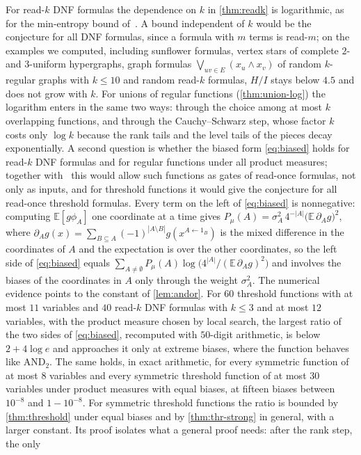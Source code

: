 \documentclass[11pt]{amsart}
\theoremstyle{definition}
\theoremstyle{remark}
\newcommand{\E}{\mathbb{E}}
\begin{document}
For read-$k$ DNF formulas the dependence on $k$ in \cref{thm:readk} is logarithmic, as for the min-entropy
bound of~\cite{ACKSW21}. A bound independent of $k$ would be the conjecture for all DNF formulas, since a formula
with $m$ terms is read-$m$; on the examples we computed, including sunflower formulas, vertex stars of complete $2$-
and $3$-uniform hypergraphs, graph formulas $\bigvee_{uv\in E}(x_u\wedge x_v)$ of random $k$-regular graphs with
$k\le10$ and random read-$k$ formulas, $H/I$ stays below $4.5$ and does not grow with $k$. For unions of regular
functions (\cref{thm:union-log}) the logarithm enters in the same two ways: through the choice among at most $k$
overlapping functions, and through the Cauchy--Schwarz step, whose factor $k$ costs only $\log k$ because the rank
tails and the level tails of the pieces decay exponentially. A second
question is whether the biased form \eqref{eq:biased} holds for read-$k$ DNF formulas and for regular functions
under all product measures; together with~\cite{OT13} this would allow such functions as gates of read-once
formulas, not only as inputs, and for threshold functions it would give the conjecture for all read-once threshold
formulas. Every term on the left of \eqref{eq:biased} is nonnegative: computing $\E[g\phi_A]$ one coordinate at a time
gives $P_\mu(A)=\sigma_A^2\,4^{-|A|}\bigl(\E\,\partial_Ag\bigr)^2$, where
$\partial_Ag(x)=\sum_{B\subseteq A}(-1)^{|A\setminus B|}g(x^{A\leftarrow1_B})$ is the mixed difference in the
coordinates of $A$ and the expectation is over the other coordinates, so the left side of \eqref{eq:biased} equals
$\sum_{A\ne\emptyset}P_\mu(A)\log\bigl(4^{|A|}/(\E\,\partial_Ag)^2\bigr)$ and involves the biases of the coordinates in
$A$ only through the weight $\sigma_A^2$. The numerical evidence points to the constant of \cref{lem:andor}. For $60$ threshold functions with at
most $11$ variables and $40$ read-$k$ DNF formulas with $k\le3$ and at most $12$ variables, with the product measure
chosen by local search, the largest ratio of the two sides of \eqref{eq:biased}, recomputed with $50$-digit
arithmetic, is below $2+4\log e$ and approaches it only at extreme biases, where the function behaves like
$\mathrm{AND}_2$. The same holds, in exact arithmetic, for every symmetric function of at most $8$ variables and
every symmetric threshold function of at most $30$ variables under product measures with equal biases, at
fifteen biases between $10^{-8}$ and $1-10^{-8}$. For symmetric threshold functions the ratio is
bounded by \cref{thm:threshold} under equal biases and by \cref{thm:thr-strong} in general, with a larger constant. Its proof isolates what a general proof needs: after the rank step, the only
\end{document}
